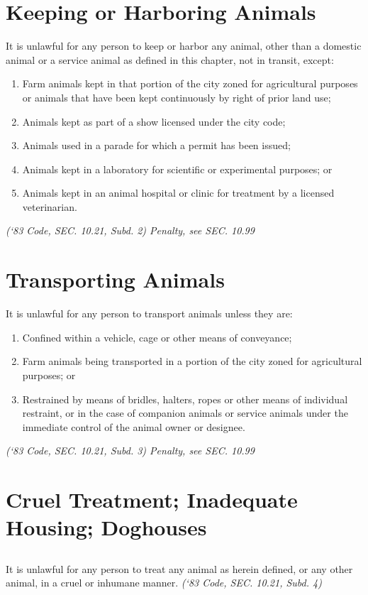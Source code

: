 \section{Keeping or Harboring Animals}
It is unlawful for any person to keep or harbor any animal, other than a domestic animal or a service animal as defined in this chapter, not in transit, except:
\begin{enumerate}[{\indent}A)]
\item Farm animals kept in that portion of the city zoned for agricultural purposes or animals that have been kept continuously by right of prior land use;
\item Animals kept as part of a show licensed under the city code;
\item Animals used in a parade for which a permit has been issued;
\item Animals kept in a laboratory for scientific or experimental purposes; or
\item Animals kept in an animal hospital or clinic for treatment by a licensed veterinarian.
\end{enumerate}
\emph{(‘83 Code, SEC. 10.21, Subd. 2)  Penalty, see SEC. 10.99}

\section{Transporting Animals}
It is unlawful for any person to transport animals unless they are:
\begin{enumerate}[{\indent}A)]
\item Confined within a vehicle, cage or other means of conveyance;
\item Farm animals being transported in a portion of the city zoned for agricultural purposes; or
\item Restrained by means of bridles, halters, ropes or other means of individual restraint, or in the case of companion animals or service animals under the immediate control of the animal owner or designee.
\end{enumerate}
\emph{(‘83 Code, SEC. 10.21, Subd. 3)  Penalty, see SEC. 10.99}

\section{Cruel Treatment; Inadequate Housing; Doghouses}
\subsection{}
It is unlawful for any person to treat any animal as herein defined, or any other animal, in a cruel or inhumane manner.\newline
\emph{(‘83 Code, SEC. 10.21, Subd. 4)}
